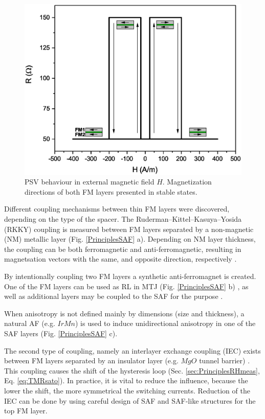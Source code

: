     \begin{figure}[H]
        \centering
        \includegraphics[width=0.7\paperwidth]{img/03/MTJ_characteristics_PSV.eps}
        \caption{PSV behaviour in external magnetic field $H$. Magnetization directions of both FM layers presented in stable states.}
        \label{PrinciplesPSV}
    \end{figure}    
    
    Different coupling mechanisms between thin FM layers were discovered, depending on the type of the spacer. The Ruderman–Kittel–Kasuya–Yosida (RKKY) \cite{yosida1957magnetic} coupling is measured between FM layers separated by a non-magnetic (NM) metallic layer (Fig. \ref{PrinciplesSAF} a). Depending on NM layer thickness, the coupling can be both ferromagnetic and anti-ferromagnetic, resulting in magnetsation vectors with the same, and opposite direction, respectively \cite{stobiecki2012urzadzenia}. 
    
    By intentionally coupling two FM layers a synthetic anti-ferromagnet is created. One of the FM layers can be used as RL in MTJ (Fig. \ref{PrinciplesSAF} b) \cite{bandiera2010comparison, zhu1999spin}, as well as additional layers may be coupled to the SAF for the purpose \cite{wang2015tunnel}.
    
    When anisotropy is not defined mainly by dimensions (size and thickness), a natural AF (e.g. $IrMn$) is used to induce unidirectional anisotropy in one of the SAF layers (Fig. \ref{PrinciplesSAF} c).
    
    The second type of coupling, namely an interlayer exchange coupling (IEC) exists between FM layers separated by an insulator layer (e.g. $MgO$ tunnel barrier) \cite{katayama2006interlayer,jiancheng2015effect}. This coupling causes the shift of the hysteresis loop (Sec. \ref{sec:PrinciplesRHmeas}, Eq. \ref{eq:TMRsato}). In practice, it is vital to reduce the influence, because the lower the shift, the more symmetrical the switching currents. Reduction of the IEC can be done by using careful design of SAF and SAF-like structures for the top FM layer.
    
